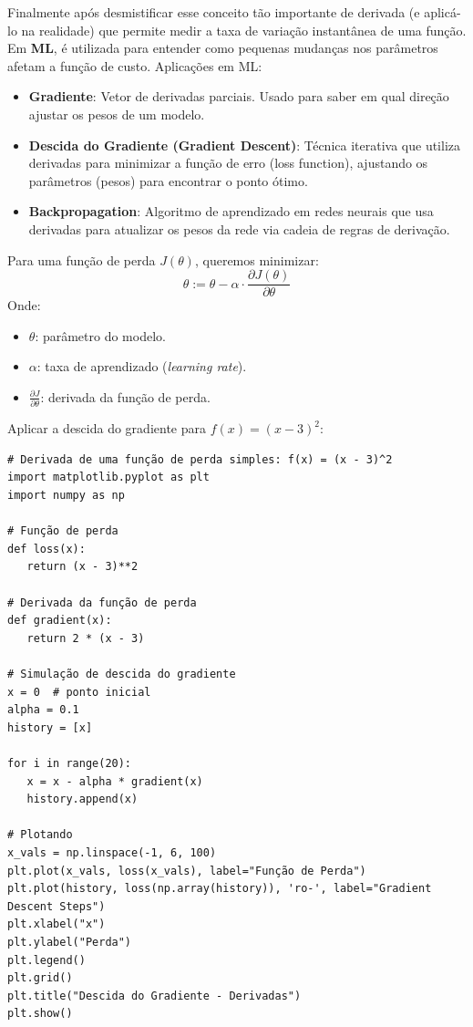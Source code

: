 Finalmente após desmistificar esse conceito tão importante de derivada (e aplicá-lo na realidade) que permite medir a taxa de variação instantânea de uma função. Em \textbf{ML}, é utilizada para entender como pequenas mudanças nos parâmetros afetam a função de custo. Aplicações em ML: \vspace{-1em}
\begin{itemize}[]
	\item \textbf{Gradiente}: Vetor de derivadas parciais. Usado para saber em qual direção ajustar os pesos de um modelo.
	\item \textbf{Descida do Gradiente (Gradient Descent)}: Técnica iterativa que utiliza derivadas para minimizar a função de erro (loss function), ajustando os parâmetros (pesos) para encontrar o ponto ótimo.
	\item \textbf{Backpropagation}: Algoritmo de aprendizado em redes neurais que usa derivadas para atualizar os pesos da rede via cadeia de regras de derivação.\textbf{}
\end{itemize}

Para uma função de perda $J(\theta)$, queremos minimizar: \vspace{-1em}
\[
\theta := \theta - \alpha \cdot \frac{\partial J(\theta)}{\partial \theta}
\]
Onde: \vspace{-1em}
\begin{itemize}[]
	\item $\theta$: parâmetro do modelo.
	\item $\alpha$: taxa de aprendizado (\textit{learning rate}).
	\item $\frac{\partial J}{\partial \theta}$: derivada da função de perda.
\end{itemize}

Aplicar a descida do gradiente para $f(x) = (x - 3)^2$:
\begin{lstlisting}[]
# Derivada de uma função de perda simples: f(x) = (x - 3)^2
import matplotlib.pyplot as plt
import numpy as np

# Função de perda
def loss(x):
   return (x - 3)**2

# Derivada da função de perda
def gradient(x):
   return 2 * (x - 3)

# Simulação de descida do gradiente
x = 0  # ponto inicial
alpha = 0.1
history = [x]

for i in range(20):
   x = x - alpha * gradient(x)
   history.append(x)

# Plotando
x_vals = np.linspace(-1, 6, 100)
plt.plot(x_vals, loss(x_vals), label="Função de Perda")
plt.plot(history, loss(np.array(history)), 'ro-', label="Gradient Descent Steps")
plt.xlabel("x")
plt.ylabel("Perda")
plt.legend()
plt.grid()
plt.title("Descida do Gradiente - Derivadas")
plt.show()
\end{lstlisting}

